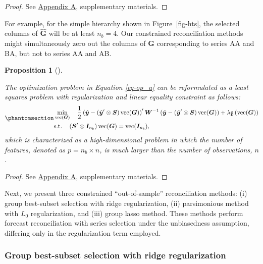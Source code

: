 \documentclass[
  11pt]{article}
\theoremstyle{plain}
\newtheorem{proposition}{Proposition}[section]
\theoremstyle{remark}
\begin{document}
\begin{proof}
See \hyperref[appendix-proofs]{Appendix A}, supplementary materials.
\end{proof}

For example, for the simple hierarchy shown in Figure~\ref{fig-hts}, the
selected columns of \(\hat{\bm{G}}\) will be at least \(n_b=4\). Our
constrained reconciliation methods might simultaneously zero out the
columns of \(\bm{G}\) corresponding to series AA and BA, but not to
series AA and AB.

\begin{proposition}[]\protect\hypertarget{prp-2}{}\label{prp-2}

The optimization problem in Equation \eqref{eq-op_u} can be reformulated
as a least squares problem with regularization and linear equality
constraint as follows:
\begin{equation}\phantomsection\label{eq-op_u_reg}{
\begin{aligned}
& \min_{\operatorname{vec}(\bm{G})} \quad \frac{1}{2}\left(\hat{\bm{y}}-\left(\hat{\bm{y}}^{\prime} \otimes \bm{S}\right) \operatorname{vec}(\bm{G})\right)^{\prime} \bm{W}^{-1}\left(\hat{\bm{y}}-\left(\hat{\bm{y}}^{\prime} \otimes \bm{S}\right) \operatorname{vec}(\bm{G})\right) + \lambda\mathfrak{g}\left(\operatorname{vec}(\bm{G})\right) \\
& \text{s.t.} \quad \left(\bm{S}^{\prime} \otimes \bm{I}_{n_b}\right) \operatorname{vec}(\bm{G})=\operatorname{vec}(\bm{I}_{n_b}),
\end{aligned}
}\end{equation} which is characterized as a high-dimensional problem in
which the number of features, denoted as \(p = n_b \times n\), is much
larger than the number of observations, \(n\).

\end{proposition}

\begin{proof}
See \hyperref[appendix-proofs]{Appendix A}, supplementary materials.
\end{proof}

Next, we present three constrained ``out-of-sample'' reconciliation
methods: (i) group best-subset selection with ridge regularization, (ii)
parsimonious method with \(L_0\) regularization, and (iii) group lasso
method. These methods perform forecast reconciliation with series
selection under the unbiasedness assumption, differing only in the
regularization term employed.

\subsubsection*{Group best-subset selection with ridge
regularization}\label{group-best-subset-selection-with-ridge-regularization}
\end{document}
